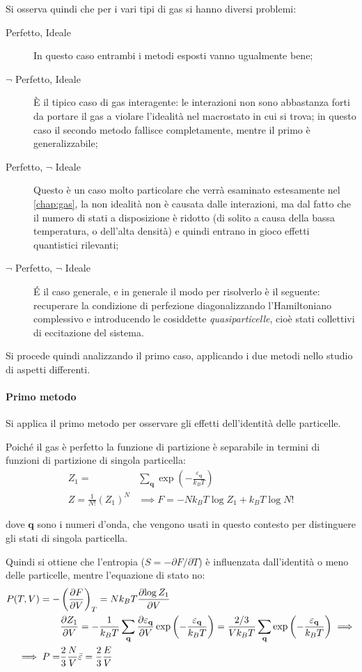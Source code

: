 Si osserva quindi che per i vari tipi di gas si hanno diversi problemi:
\begin{description}
	\item[Perfetto, Ideale] In questo caso entrambi i metodi esposti vanno ugualmente bene;
	\item[$\neg$ Perfetto, Ideale] \`E il tipico caso di gas interagente: le interazioni non sono abbastanza forti da portare il gas a violare l'idealità nel macrostato in cui si trova; in questo caso il secondo metodo fallisce completamente, mentre il primo è generalizzabile;
	\item[Perfetto, $\neg$ Ideale] Questo è un caso molto particolare che verrà esaminato estesamente nel \cref{chap:gas}, la non idealità non è causata dalle interazioni, ma dal fatto che il numero di stati a disposizione è ridotto (di solito a causa della bassa temperatura, o dell'alta densità) e quindi entrano in gioco effetti quantistici rilevanti;
	\item[$\neg$ Perfetto, $\neg$ Ideale] \'E il caso generale, e in generale il modo per risolverlo è il seguente: recuperare la condizione di perfezione diagonalizzando l'Hamiltoniano complessivo e introducendo le cosiddette \textit{quasiparticelle}, cioè stati collettivi di eccitazione del sistema. 
\end{description}

 Si procede quindi analizzando il primo caso, applicando i due metodi nello studio di aspetti differenti.

\paragraph{Primo metodo} Si applica il primo metodo per osservare gli effetti dell'identità delle particelle.

Poiché il gas è perfetto la funzione di partizione è separabile in termini di funzioni di partizione di singola particella:
\begin{align*}
Z_1 = &\sum_{\textbf{q}} \exp \left( - \frac{\varepsilon_{\textbf{q}}}{k_B T}\right)\\
Z = \frac{1}{N!} (Z_1)^N &\implies F = -N k_B T \log Z_1 + k_B T \log N!
\end{align*}

\noindent dove $\textbf{q}$ sono i numeri d'onda, che vengono usati in questo contesto per distinguere gli stati di singola particella.

Quindi si ottiene che l'entropia ($S = - \partial F / \partial T$) è influenzata dall'identità o meno delle particelle, mentre l'equazione di stato no:
\begin{align*}
P(T,V) = - &\left(\frac{\partial {F}}{\partial {V}}\right)_{T} = N k_B T \frac{\partial {\log Z_1}}{\partial {V}}\\
& \frac{\partial {Z_1}}{\partial {V}} = - \frac{1}{k_B T} \sum_{\textbf{q}} \frac{\partial {\varepsilon_{\textbf{q}}}}{\partial {V}}\exp \left( - \frac{\varepsilon_{\textbf{q}}}{k_B T}\right) = \frac{2/3}{V k_B T} \sum_{\textbf{q}} \exp \left( - \frac{\varepsilon_{\textbf{q}}}{k_B T}\right) \implies\\
\implies P = &\frac{2}{3} \frac{N}{V} \bar{\varepsilon} = \frac{2}{3} \frac{E}{V}
\end{align*}


